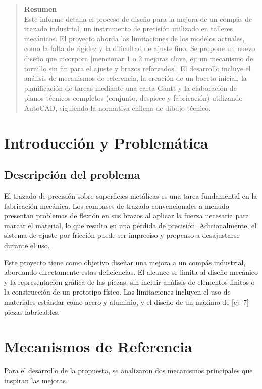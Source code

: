 \documentclass[11pt, a4paper]{article}
\begin{document}
\begin{abstract}
    \noindent \textbf{Resumen} \\
    Este informe detalla el proceso de diseño para la mejora de un compás de trazado industrial, un instrumento de precisión utilizado en talleres mecánicos. El proyecto aborda las limitaciones de los modelos actuales, como la falta de rigidez y la dificultad de ajuste fino. Se propone un nuevo diseño que incorpora [mencionar 1 o 2 mejoras clave, ej: un mecanismo de tornillo sin fin para el ajuste y brazos reforzados]. El desarrollo incluye el análisis de mecanismos de referencia, la creación de un boceto inicial, la planificación de tareas mediante una carta Gantt y la elaboración de planos técnicos completos (conjunto, despiece y fabricación) utilizando AutoCAD, siguiendo la normativa chilena de dibujo técnico.
\end{abstract}

\newpage
\tableofcontents
\newpage

\section{Introducción y Problemática}
\subsection{Descripción del problema}
El trazado de precisión sobre superficies metálicas es una tarea fundamental en la fabricación mecánica. Los compases de trazado convencionales a menudo presentan problemas de flexión en sus brazos al aplicar la fuerza necesaria para marcar el material, lo que resulta en una pérdida de precisión. Adicionalmente, el sistema de ajuste por fricción puede ser impreciso y propenso a desajustarse durante el uso.

Este proyecto tiene como objetivo diseñar una mejora a un compás industrial, abordando directamente estas deficiencias. El alcance se limita al diseño mecánico y la representación gráfica de las piezas, sin incluir análisis de elementos finitos o la construcción de un prototipo físico. Las limitaciones incluyen el uso de materiales estándar como acero y aluminio, y el diseño de un máximo de [ej: 7] piezas fabricables.

\section{Mecanismos de Referencia}
Para el desarrollo de la propuesta, se analizaron dos mecanismos principales que inspiran las mejoras.
\end{document}
